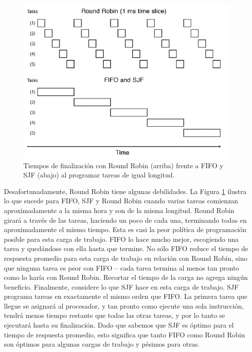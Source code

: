 \documentclass[10pt]{book}
\begin{document}
\begin{figure}[tbhp]
\centerline{\includegraphics[scale=0.70]{img/fig0703}}
\caption{Tiempos de finalización con Round Robin (arriba) frente a FIFO y SJF (abajo) al programar tareas de igual longitud.}
\label{fig0703}
\end{figure}

Desafortunadamente, Round Robin tiene algunas debilidades. La Figura \ref{fig0703} ilustra lo que sucede para FIFO, SJF y Round Robin cuando varias tareas comienzan aproximadamente a la misma hora y son de la misma longitud. Round Robin girará a través de las tareas, haciendo un poco de cada una, terminando todas en aproximadamente el mismo tiempo. Esta es casi la peor política de programación posible para esta carga de trabajo. FIFO lo hace mucho mejor, escogiendo una tarea y quedándose con ella hasta que termine. No sólo FIFO reduce el tiempo de respuesta promedio para esta carga de trabajo en relación con Round Robin, sino que ninguna tarea es peor con FIFO -- cada tarea termina al menos tan pronto como lo haría con Round Robin. Recortar el tiempo de la carga no agrega ningún beneficio. Finalmente, considere lo que SJF hace en esta carga de trabajo. SJF programa tareas en exactamente el mismo orden que FIFO. La primera tarea que llegue se asignará al procesador, y tan pronto como ejecute una sola instrucción, tendrá menos tiempo restante que todas las otras tareas, y por lo tanto se ejecutará hasta su finalización. Dado que sabemos que SJF es óptimo para el tiempo de respuesta promedio, esto significa que tanto FIFO como Round Robin son óptimos para algunas cargas de trabajo y pésimos para otras.
\end{document}
